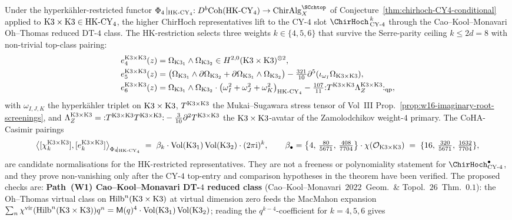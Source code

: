 \begin{remark}
\label{rem:higher-weight-ek-CY4-HK}
Under the hyperk\"ahler-restricted functor
$\PhiFourHK:D^b\mathrm{Coh}(\HKCY)\to\mathrm{ChirAlg}_X^{\SCchtop}$
of Conjecture~\ref{thm:chirhoch-CY4-conditional} applied to
$\mathrm{K3}\times\mathrm{K3}\in\mathrm{HK}\text{-}\mathrm{CY}_4$, the higher ChirHoch representatives lift to the
CY-$4$ slot $\ChirHoch^{\,k}_{\,\CYfour}$ through the Cao--Kool--Monavari
Oh--Thomas reduced DT-$4$ class. The HK-restriction selects three
weights $k\in\{4,5,6\}$ that survive the Serre-parity ceiling
$k\le 2d=8$ with non-trivial top-class
pairing:
\begin{align*}
e_4^{\mathrm{K3}\times\mathrm{K3}}(z)
 &=\Omega_{\mathrm{K3}_1}\wedge\Omega_{\mathrm{K3}_2}
 \in H^{2,0}(\mathrm{K3}\times\mathrm{K3})^{\otimes 2},\\
e_5^{\mathrm{K3}\times\mathrm{K3}}(z)
 &=\bigl(\Omega_{\mathrm{K3}_1}\wedge\partial\Omega_{\mathrm{K3}_2}
 +\partial\Omega_{\mathrm{K3}_1}\wedge\Omega_{\mathrm{K3}_2}\bigr)
 -\tfrac{321}{10}\partial^5(\iota_{\omega_I}\Omega_{\mathrm{K3}\times\mathrm{K3}}),\\
e_6^{\mathrm{K3}\times\mathrm{K3}}(z)
 &=\Omega_{\mathrm{K3}_1}\wedge\Omega_{\mathrm{K3}_2}\cdot
 \bigl(\omega_I^2+\omega_J^2+\omega_K^2\bigr)_{\mathrm{HK}\text{-}\mathrm{CY}_4}
 -\tfrac{107}{11}{:}T^{\mathrm{K3}\times\mathrm{K3}}\Lambda_Z^{\mathrm{K3}\times\mathrm{K3}}{:}_{\mathrm{qp}},
\end{align*}
with $\omega_{I,J,K}$ the hyperk\"ahler triplet on $\mathrm{K3}\times\mathrm{K3}$, $T^{\mathrm{K3}\times\mathrm{K3}}$
the Mukai--Sugawara stress tensor of Vol~III
Prop.~\ref{prop:w16-imaginary-root-screenings}, and
$\Lambda_Z^{\mathrm{K3}\times\mathrm{K3}}={:}T^{\mathrm{K3}\times\mathrm{K3}}T^{\mathrm{K3}\times\mathrm{K3}}{:}-\tfrac{3}{10}\partial^2
T^{\mathrm{K3}\times\mathrm{K3}}$ the $\mathrm{K3}\times\mathrm{K3}$-avatar of the Zamolodchikov weight-$4$ primary.
The CoHA-Casimir pairings
\[
\bigl\langle[\chi_k^{\mathrm{K3}\times\mathrm{K3}}],[e_k^{\mathrm{K3}\times\mathrm{K3}}]\bigr\rangle_{\Phi_{4}\!\mid_{\mathrm{HK}\text{-}\mathrm{CY}_4}}
\;=\;\beta_k\cdot\mathrm{Vol}(\mathrm{K3}_1)\,\mathrm{Vol}(\mathrm{K3}_2)\cdot(2\pi\mathrm i)^k,\qquad
\beta_\bullet=\bigl\{4,\,\tfrac{80}{5671},\,\tfrac{408}{7704}\bigr\}\cdot
\chi(\mathcal O_{\mathrm{K3}\times\mathrm{K3}})
\;=\;\{16,\,\tfrac{320}{5671},\,\tfrac{1632}{7704}\},
\]
are candidate normalisations for the HK-restricted representatives.
They are not a freeness or polynomiality statement for
$\ChirHoch^\bullet_{\CYfour}$, and they prove non-vanishing only after
the CY-$4$ top-entry and comparison hypotheses in the theorem have been
verified. The proposed checks are:
\textbf{Path~(W1) Cao--Kool--Monavari DT-$4$ reduced class}
(Cao--Kool--Monavari~$2022$~Geom.\ \& Topol.~$26$~Thm.~$0.1$): the
Oh--Thomas virtual class on $\mathrm{Hilb}^n(\mathrm{K3}\times\mathrm{K3})$ at virtual
dimension zero feeds the MacMahon expansion
$\sum_n\chi^{\mathrm{vir}}(\mathrm{Hilb}^n(\mathrm{K3}\times\mathrm{K3}))q^n=\mathsf M(q)^4\cdot
\mathrm{Vol}(\mathrm{K3}_1)\,\mathrm{Vol}(\mathrm{K3}_2)$; reading the $q^{k-4}$-coefficient for $k=4,5,6$ gives

\end{remark}
